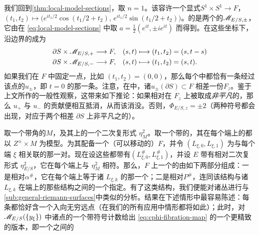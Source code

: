 \begin{example}\label{thm:local-model-n1-evaluation}
我们回到\cref{thm:local-model-sections}，取 $n=1$。该\trBoundaryCondition{}容许一个显式\trParametrization{}$S^1\times S^1\to F$，$(t_1,t_2)\mapsto\bigl(e^{it_1/2}\cos(t_1/2+t_2),\,e^{it_1/2}\sin(t_1/2+t_2)\bigr)$。\trSection{}的\trModuliSpace{}是两个\trCircle{}的\trDisjointUnion{}$\mathscr{M}_{E/S,\pm}$，它由在 \eqref{eq:local-model-sections} 中取 $a=\tfrac{1}{2}(e^{it},\pm ie^{it})$ 而得到。在这些坐标下，沿边界的\trEvaluationMap{}成为
\begin{equation*}
\begin{aligned}
&\partial S\times\mathscr{M}_{E/S,+}\longrightarrow F, &&(s,t)\longmapsto(t_1,t_2)=(s,t-s)\\
&\partial S\times\mathscr{M}_{E/S,-}\longrightarrow F, &&(s,t)\longmapsto(t_1,t_2)=(s,t).
\end{aligned}
\end{equation*}
如果我们在 $F$ 中固定一点，比如 $(t_1,t_2)=(0,0)$，那么每个\trFamily{}中都恰有一条经过该点的\trSection{}$u_{\pm}$，即 $t=0$ 的那一条。注意，在\trHomology{}中，诸\trCircle{}$u_{\pm}(\partial S)\subset F$ 相差一份\trFiber{}$F_z$。鉴于上文所作的一般性观察，这带来如下推论：如果相对\trPinStructure{}在 $F_z$ 上被取成\emph{非平凡}的，那么 $u_+$ 与 $u_-$ 的贡献便相互抵消，从而该\trInvariant{}消没。否则，$\Phi_{E/S,z}=\pm 2$（两种符号都会出现，对应于两个相差 $\partial S$ 上非平凡\trLineBundle{}之\trPullback{}的\trPinStructure）。
\end{example}
取一个带角的\trExactSymplectic\trManifold{}$M$，及其上的一个二次复\trVolume{}形式 $\eta^2_M$。取一个带\trStriplikeEnd{}的\trLefschetzFibration，其在每个端上的\trTrivialization{}都以 $Z^{\pm}\times M$ 为模型。为其配备一个（可以移动的）\trLagrange\trBoundaryCondition{}$F$，并令 $(L_{\xi,0},L_{\xi,1})$ 为与每个端 $\xi$ 相关联的那一对\trLagrange\trSubmanifold。现在设这些\trSubmanifold{}都带有\trBraneStructure{}$(L^{\#}_{\xi,0},L^{\#}_{\xi,1})$，并设 $E$ 带有相对二次复\trVolume{}形式 $\eta^2_{E/S}$，它在每个端上与 $\eta^2_M$ 相符。那么，$F$ 上一个\trCompatible{}的\trRelative\trBraneStructure{}由如下两部分组成：一是相对\trGrading{}$\alpha^{\#}$，它在每个端上等于诸 $L_{\xi,k}$ 的那一个；二是相对\trPinStructure{}$P^{\#}$，连同该结构与诸 $L_{\xi,k}$ 在端上的那些结构之间的一个指定\trIsomorphism。有了这类结构，我们便能对诸\trDeterminantLine{}丛进行与\cref{sub:general-riemann-surfaces}中类似的分析。结果在下述情形中最容易陈述：每条\trBoundaryCircle{}都恰好含一个入向无穷远点（在我们的所有应用中情形都将如此）；此时，对 $\mathscr{M}_{E/S}(\{y_{\xi}\})$ 中诸\trIsolated{}点的一个带符号计数给出 \eqref{eq:cphi-fibration-map} 的一个更精致的版本，即一个\trCochainComplex{}之间的\trChainMap
